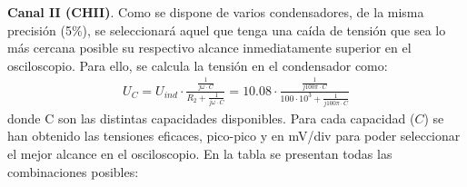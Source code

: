 \documentclass[a4paper,titlepage]{article}
\begin{document}
\textbf{Canal II (CHII)}. Como se dispone de varios condensadores, de la misma precisión (5\%), se seleccionará aquel que tenga una caída de tensión que sea lo más cercana posible su respectivo alcance inmediatamente superior en el osciloscopio. Para ello, se calcula la tensión en el condensador como:
\begin{gather*}
    U_C=U_{ind}\cdot\frac{\frac{1}{j\omega\cdot C}}{R_2+\frac{1}{j\omega\cdot C}}=10.08\cdot\frac{\frac{1}{j100\pi\cdot C}}{100\cdot10^3+\frac{1}{j100\pi\cdot C}}
\end{gather*}
donde C son las distintas capacidades disponibles.
Para cada capacidad ($C$) se han obtenido las tensiones eficaces, pico-pico y en mV/div para poder seleccionar el mejor alcance en el osciloscopio. En la tabla se presentan todas las combinaciones posibles:
\newpage
\end{document}
